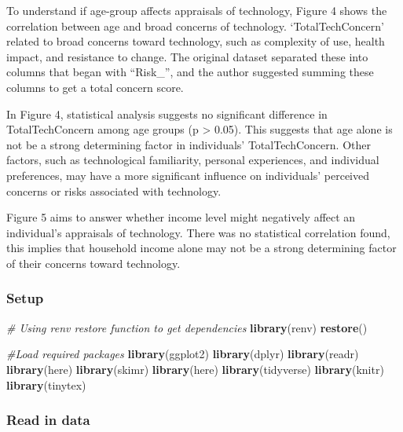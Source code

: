 \documentclass[
]{article}
\newenvironment{Shaded}{\begin{snugshade}}{\end{snugshade}}
\newcommand{\CommentTok}[1]{\textcolor[rgb]{0.56,0.35,0.01}{\textit{#1}}}
\newcommand{\FunctionTok}[1]{\textcolor[rgb]{0.13,0.29,0.53}{\textbf{#1}}}
\newcommand{\NormalTok}[1]{#1}
\begin{document}
To understand if age-group affects appraisals of technology, Figure 4
shows the correlation between age and broad concerns of technology.
`TotalTechConcern' related to broad concerns toward technology, such as
complexity of use, health impact, and resistance to change. The original
dataset separated these into columns that began with ``Risk\_'', and the
author suggested summing these columns to get a total concern score.

In Figure 4, statistical analysis suggests no significant difference in
TotalTechConcern among age groups (p \textgreater{} 0.05). This suggests
that age alone is not be a strong determining factor in individuals'
TotalTechConcern. Other factors, such as technological familiarity,
personal experiences, and individual preferences, may have a more
significant influence on individuals' perceived concerns or risks
associated with technology.

Figure 5 aims to answer whether income level might negatively affect an
individual's appraisals of technology. There was no statistical
correlation found, this implies that household income alone may not be a
strong determining factor of their concerns toward technology.

\hypertarget{setup}{%
\subsubsection{Setup}\label{setup}}

\begin{Shaded}
\begin{Highlighting}[]
\CommentTok{\# Using renv restore function to get dependencies }
\FunctionTok{library}\NormalTok{(renv)}
\FunctionTok{restore}\NormalTok{()}

\CommentTok{\#Load required packages}
\FunctionTok{library}\NormalTok{(ggplot2)}
\FunctionTok{library}\NormalTok{(dplyr)}
\FunctionTok{library}\NormalTok{(readr)}
\FunctionTok{library}\NormalTok{(here)}
\FunctionTok{library}\NormalTok{(skimr)}
\FunctionTok{library}\NormalTok{(here)}
\FunctionTok{library}\NormalTok{(tidyverse)}
\FunctionTok{library}\NormalTok{(knitr)}
\FunctionTok{library}\NormalTok{(tinytex)}
\end{Highlighting}
\end{Shaded}

\hypertarget{read-in-data}{%
\subsubsection{Read in data}\label{read-in-data}}
\end{document}
